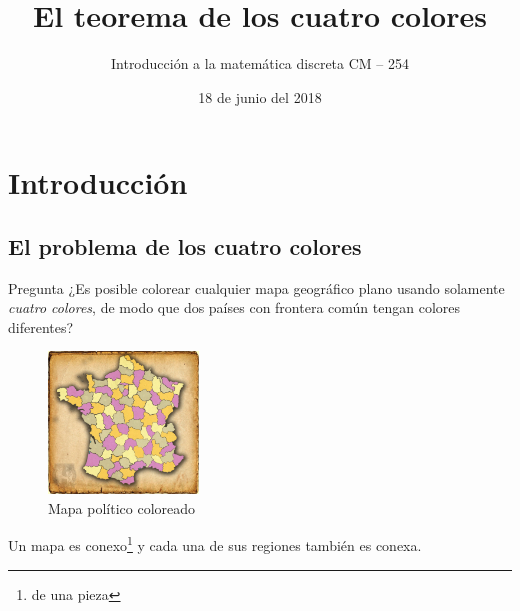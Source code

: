 \documentclass[spanish,utf8]{beamer}
\title[Teorema de los cuatro colores]{\Huge\sffamily El teorema de los cuatro colores}
\subtitle{Introducción a la matemática discreta CM -- 254}
\author[Grupo N$^\circ6$]{%
	\texorpdfstring{%
		\begin{columns}
			\column{.3\linewidth}
			\centering
			C. Aznarán Laos %
			\column{.3\linewidth}
			\centering
			F. Cruz Ordoñez %
		\end{columns}
		\vspace{12pt}
		\begin{columns}
			\column{.3\linewidth}
			\centering
			G. Quiroz Gómez %
			\column{.3\linewidth}
			\centering
			J. Navío Torres %
		\end{columns}
	}
	{Author 1, Author 2, Author 3}
}
\institute[FC -- UNI]{\large%
	Facultad de Ciencias \and%
	Universidad Nacional de Ingeniería
}
\date{18 de junio del 2018}
\theoremstyle{definition}
\begin{document}
\begin{frame}[plain]
\maketitle
\end{frame}

\section{Introducción}

\begin{frame}{\contentsname}\transblindsvertical
\tableofcontents
\end{frame}

\subsection{El problema de los cuatro colores}


\begin{frame}{\insertsubsection}\transblindsvertical

\begin{alertblock}{Pregunta} %
	¿Es posible colorear cualquier mapa geográfico plano usando solamente \emph{cuatro colores}, de modo que dos países con frontera común tengan colores diferentes? 
\end{alertblock}

\begin{minipage}[c]{6cm}
	\begin{figure}
		\centering
		\includegraphics[width=4cm]{mapa-4-colores_HR.jpg}
		\caption{Mapa político coloreado}
	\end{figure}
\end{minipage}
\begin{minipage}[c]{5cm}
	\begin{definition}
		Un mapa es conexo\footnote{de una pieza} y cada una de sus regiones también es conexa.
	\end{definition}
\end{minipage}
\end{frame}
\end{document}
